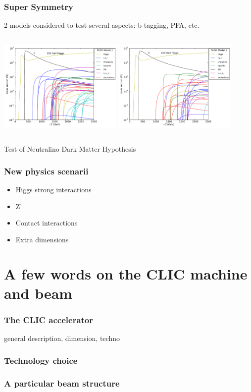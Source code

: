 \documentclass{beamer}
\begin{document}
\begin{frame}
\frametitle{Super Symmetry}
2 models considered to test several aspects: b-tagging, PFA, etc.
\begin{columns}[c]
\column{6cm}
\includegraphics[width=6cm]{susy_model1}
\column{6cm}
\includegraphics[width=6cm]{susy_model2}
\end{columns}
Test of Neutralino Dark Matter Hypothesis
\end{frame}

\begin{frame}
\frametitle{New physics scenarii}
\begin{itemize}
  \item Higgs strong interactions
  \item Z'
  \item Contact interactions
  \item Extra dimensions
\end{itemize}
\end{frame}

\section[CLIC]{A few words on the CLIC machine and beam} 
\begin{frame}
\frametitle{The CLIC accelerator}
general description, dimension, techno
\end{frame}

\begin{frame}
\frametitle{Technology choice}
\end{frame}

\begin{frame}
\frametitle{A particular beam structure}

\end{frame}
\end{document}
